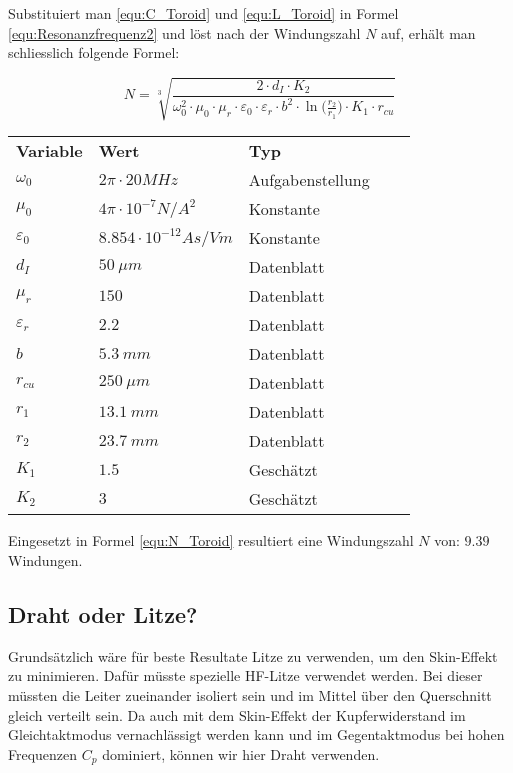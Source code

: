 Substituiert man \ref{equ:C_Toroid} und \ref{equ:L_Toroid} in Formel \ref{equ:Resonanzfrequenz2} und löst nach der Windungszahl $N$ auf, erhält man schliesslich folgende Formel:

\begin{equation}
N = \sqrt[3]{\frac{2\cdot d_{I}\cdot K_{2}}{\omega_{0}^{2}\cdot \mu_{0}\cdot \mu_{r}\cdot \varepsilon_{0}\cdot \varepsilon_{r}\cdot b^{2}\cdot \ln \Big(\frac{r_{2}}{r_{1}}\Big)\cdot K_{1}\cdot r_{cu}}}
\label{equ:N_Toroid}
\end{equation}

\begin{table}[H]
	\centering
	\begin{tabular}{|l|l|l|ll}
		\cline{1-3}
		\textbf{Variable} & \textbf{Wert} & \textbf{Typ} &  &  \\ \cline{1-3}
	$\omega_{0}$	&   $2\pi\cdot 20MHz$        &     Aufgabenstellung      &  &  \\ \cline{1-3}
	$\mu_{0}$	&     $4\pi\cdot 10^{-7} N/A^{2}$      &  Konstante         &  &  \\ \cline{1-3}
	$\varepsilon_{0}$	&  $8.854\cdot 10^{-12} As/Vm $         &     Konstante      &  &  \\ \cline{1-3}
	$d_{I}$	&  $\SI{50}{\mu m}$         &     Datenblatt      &  &  \\ \cline{1-3}
	$\mu_{r}$	&  $150$         &     Datenblatt      &  &  \\ \cline{1-3}
	$\varepsilon_{r}$	&  $2.2$         &     Datenblatt      &  &  \\ \cline{1-3}
	$b$	&  $\SI{5.3}{mm}$         &     Datenblatt      &  &  \\ \cline{1-3}
	$r_{cu}$	&  $\SI{250}{\mu m}$         &     Datenblatt      &  &  \\ \cline{1-3}
	$r_{1}$	&  $\SI{13.1}{mm}$         &     Datenblatt      &  &  \\ \cline{1-3}
	$r_{2}$	&  $\SI{23.7}{mm}$         &     Datenblatt      &  &  \\ \cline{1-3}
	$K_{1}$	&  $1.5$         &     Geschätzt      &  &  \\ \cline{1-3}
	$K_{2}$	&  $3$         &     Geschätzt      &  &  \\ \cline{1-3}
	\end{tabular}
\end{table}

Eingesetzt in Formel \ref{equ:N_Toroid} resultiert eine Windungszahl $N$ von: $9.39$ Windungen.

\subsection{Draht oder Litze?}
Grundsätzlich wäre für beste Resultate Litze zu verwenden, um den Skin-Effekt zu minimieren. Dafür müsste spezielle HF-Litze verwendet werden. Bei dieser müssten die Leiter zueinander isoliert sein und im Mittel über den Querschnitt gleich verteilt sein. Da auch mit dem Skin-Effekt der Kupferwiderstand im Gleichtaktmodus vernachlässigt werden kann und im Gegentaktmodus bei hohen Frequenzen $C_{p}$ dominiert, können wir hier Draht verwenden.




